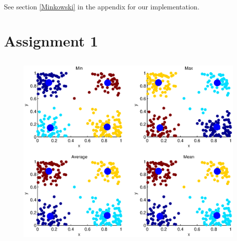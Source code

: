 \documentclass[10pt]{article}
\begin{document}
\subsection{}
See section \ref{Minkowski} in the appendix for our implementation.

\subsection{}

\section*{Assignment 1}
\subsection{}
\begin{figure}[b]
	\includegraphics[width=\columnwidth]{Ass2_1.eps}
	\caption{}
	\label{fig2a}
\end{figure}
\end{document}
